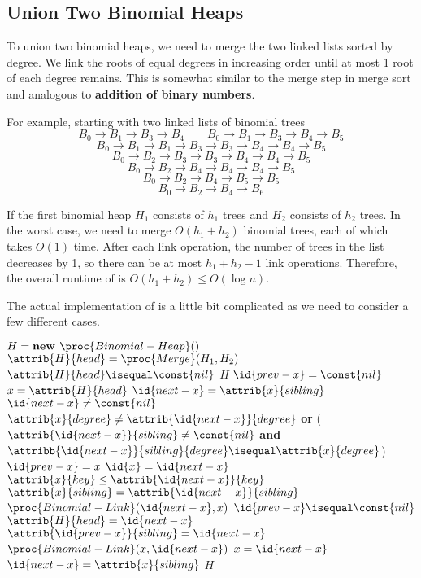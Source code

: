 \subsection{Union Two Binomial Heaps}

To union two binomial heaps, we need to merge the two linked lists sorted by degree. We link the roots of equal degrees in increasing order until at most 1 root of each degree remains. This is somewhat similar to the merge step in merge sort and analogous to \textbf{addition of binary numbers}.

For example, starting with two linked lists of binomial trees
$$
B_0 \to B_1 \to B_3 \to B_4 \qquad B_0 \to B_1 \to B_3 \to B_4 \to B_5
$$
$$
B_0 \to \boxed{B_1 \to B_1} \to B_3 \to B_3 \to B_4 \to B_4 \to B_5
$$
$$
B_0 \to B_2 \to \boxed{B_3 \to B_3} \to B_4 \to B_4 \to B_5
$$
$$
B_0 \to B_2 \to B_4 \to \boxed{B_4 \to B_4} \to B_5
$$
$$
B_0 \to B_2 \to B_4 \to \boxed{B_5 \to B_5}
$$
$$
B_0 \to B_2 \to B_4 \to B_6
$$

If the first binomial heap $H_1$ consists of $h_1$ trees and $H_2$ consists of $h_2$ trees. In the worst case, we need to merge $O(h_1+h_2)$ binomial trees, each of which takes $O(1)$ time. After each link operation, the number of trees in the list decreases by 1, so there can be at most $h_1+h_2-1$ link operations. Therefore, the overall runtime of  is $O(h_1+h_2) \leq O(\log n)$.

The actual implementation of  is a little bit complicated as we need to consider a few different cases.

\begin{codebox}
    \li $H = \textbf{new } \proc{Binomial-Heap}()$
    \li $\attrib{H}{head} = \proc{Merge}(H_1,H_2)$ 
    \li \If $\attrib{H}{head} \isequal \const{nil}$ \Then
        \li \Return $H$
        \End
    \li $\id{prev-x} = \const{nil}$
    \li $x = \attrib{H}{head}$
    \li $\id{next-x} = \attrib{x}{sibling}$
    \li \While $\id{next-x} \neq \const{nil}$ \Do
        \li \If $\attrib{x}{degree} \neq \attrib{\id{next-x}}{degree}$ \textbf{or} ($\attrib{\id{next-x}}{sibling} \neq \const{nil}$ \textbf{and} $\attribb{\id{next-x}}{sibling}{degree} \isequal \attrib{x}{degree}$) \Then
            \li $\id{prev-x} = x$
            \li $\id{x} = \id{next-x}$
        \li \ElseIf $\attrib{x}{key} \leq \attrib{\id{next-x}}{key}$ \Then
            \li $\attrib{x}{sibling} = \attrib{\id{next-x}}{sibling}$
            \li $\proc{Binomial-Link}(\id{next-x},x)$ 
        \li \Else
            \li \If $\id{prev-x} \isequal \const{nil}$ \Then
                \li $\attrib{H}{head} = \id{next-x}$ 
            \li \Else
                \li $\attrib{\id{prev-x}}{sibling} = \id{next-x}$ 
                \End
            \li $\proc{Binomial-Link}(x,\id{next-x})$
            \li $x = \id{next-x}$
        \End
        \li $\id{next-x} = \attrib{x}{sibling}$
        \End
    \li \Return $H$
\end{codebox}

